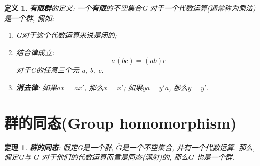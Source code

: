 \documentclass[utf8]{ctexbook}
\newtheorem{theorem}{定理}[section]
\newtheorem{definition}{定义}[section]
\begin{document}
\begin{definition}\label{def_finite_group}
\textbf{有限群}的定义: 一个\textbf{有限}的不空集合G 对于一个代数运算(通常称为乘法)是一个群, 假如:
\begin{enumerate}
\item[I.]{G对于这个代数运算来说是闭的;}
\item[II.]{结合律成立:
	\begin{equation}
		a(bc) = (ab) c 	
	\end{equation}
对于G的任意三个元 a, b, c.}
\item[III']{\textbf{消去律}: 如果$ax = a x'$, 那么$x = x'$; 如果$ya = y' a $, 那么$y = y'$.}
\end{enumerate}
\end{definition}


\section{群的同态(Group homomorphism)}

\begin{theorem}\label{thm_group_homomorphism}
\textbf{群的同态}: 假定G是一个群, $\overline{G}$是一个不空集合, 并有一个代数运算. 那么, 假定G与 $\overline{G}$ 对于他们的代数运算而言是同态(满射)的, 那么$\overline{G}$ 也是一个群.
\end{theorem}
\end{document}
